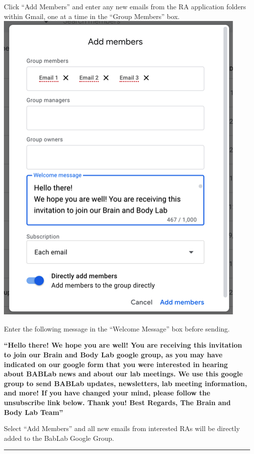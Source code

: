 \documentclass[]{book}
\begin{document}
Click ``Add Members'' and enter any new emails from the RA application folders within Gmail, one at a time in the ``Group Members'' box.
\includegraphics{images/lab_protocols/listserv/listserv_6.png}

Enter the following message in the ``Welcome Message'' box before sending.

\textbf{``Hello there!
We hope you are well! You are receiving this invitation to join our Brain and Body Lab google group, as you may have indicated on our google form that you were interested in hearing about BABLab news and about our lab meetings. We use this google group to send BABLab updates, newsletters, lab meeting information, and more! If you have changed your mind, please follow the unsubscribe link below. Thank you!
Best Regards,
The Brain and Body Lab Team''}

Select ``Add Members'' and all new emails from interested RAs will be directly added to the BabLab Google Group.

\begin{center}\rule{0.5\linewidth}{0.5pt}\end{center}
\end{document}
